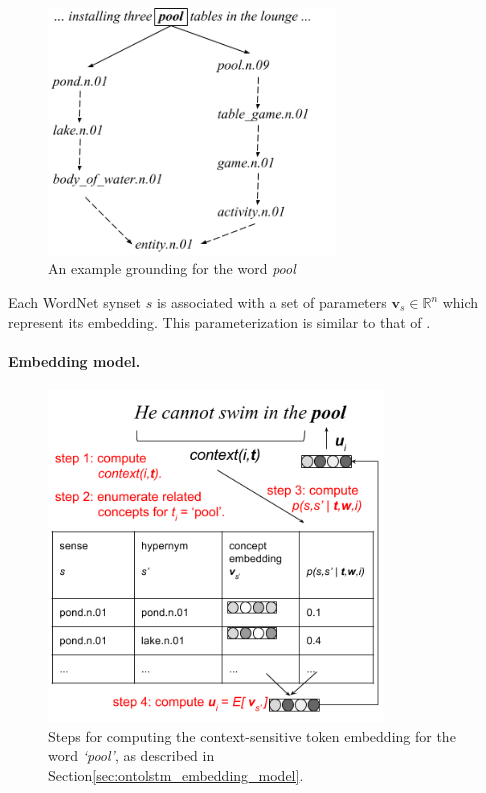 \begin{figure}
\begin{center}
\includegraphics[width=3in]{figures/ontolstm_wordnet_grounding.png}
\caption{An example grounding for the word \textit{pool}}
\label{fig:ontolstm_wordnet_grounding}
\end{center}
\end{figure}
Each WordNet synset $s$ is associated with a set of parameters $\mathbf{v}_s \in \mathbb{R}^n$ which represent its embedding. 
This parameterization is similar to that of \cite{rothe:15}.

\paragraph{Embedding model.}

\begin{figure}[t]
\begin{center}
\includegraphics[width=3.5in]{figures/ontolstm_token_embedding.png}
\caption{Steps for computing the context-sensitive token embedding for the word \textit{`pool'}, as described in Section\ref{sec:ontolstm_embedding_model}.
\label{fig:ontolstm_token_embedding}}
\end{center}
\end{figure}

